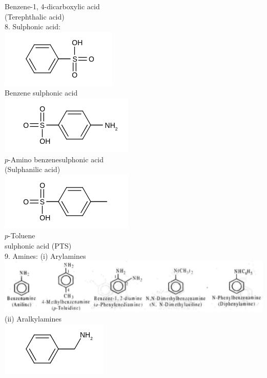 \documentclass[10pt]{article}
\begin{document}
Benzene-1, 4-dicarboxylic acid\\
(Terephthalic acid)\\
8. Sulphonic acid:\\
\includegraphics{smile-c031fe5a2b19d7f840bd874c5bd690f219901e43}\\
Benzene sulphonic acid\\
\includegraphics{smile-73fd2dcea83606829155e033a043a3edc0fa4544}\\
$p$-Amino benzenesulphonic acid\\
(Sulphanilic acid)\\
\includegraphics{smile-fb965d48f6d2652b9939fa3192fe79a174aedcc4}\\
$p$-Toluene\\
sulphonic acid (PTS)\\
9. Amines: (i) Arylamines\\
\includegraphics[max width=\textwidth, center]{2025_01_28_8470952b98110cec3aabg-032}\\
(ii) Aralkylamines\\
\includegraphics{smile-d89f433ceda642f07dd51f1ad0675d5475607e7e}
\end{document}
